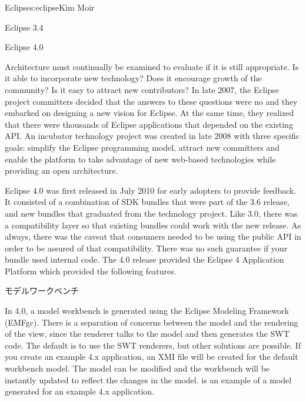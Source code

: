 \begin{aosachapter}{Eclipse}{s:eclipse}{Kim Moir}
\begin{aosasect1}{Eclipse 3.4}
\end{aosasect1}

\begin{aosasect1}{Eclipse 4.0}

Architecture must continually be examined to evaluate if it is still
appropriate. Is it able to incorporate new technology? Does it
encourage growth of the community?  Is it easy to attract new
contributors?  In late 2007, the Eclipse project committers decided
that the answers to these questions were no and they embarked on
designing a new vision for Eclipse. At the same time, they realized
that there were thousands of Eclipse applications that depended on the
existing API\@.  An incubator technology project was created in late
2008 with three specific goals: simplify the Eclipse programming
model, attract new committers and enable the platform to take
advantage of new web-based technologies while providing an open
architecture.


Eclipse 4.0 was first released in July 2010 for early adopters to
provide feedback. It consisted of a combination of SDK bundles that
were part of the 3.6 release, and new bundles that graduated from the
technology project.  Like 3.0, there was a compatibility layer so that
existing bundles could work with the new release. As always, there was
the caveat that consumers needed to be using the public API in order
to be assured of that compatibility.  There was no such guarantee if
your bundle used internal code. The 4.0 release provided the Eclipse 4
Application Platform which provided the following features.

\begin{aosasect2}{モデルワークベンチ}

In 4.0, a model workbench is generated using the Eclipse Modeling
Framework (EMFgc). There is a separation of concerns between the model
and the rendering of the view, since the renderer talks to the model
and then generates the SWT code. The default is to use the SWT
renderers, but other solutions are possible.  If you create an example
4.x application, an XMI file will be created for the default workbench
model. The model can be modified and the workbench will be instantly
updated to reflect the changes in the model. 
is an example of a model generated for an example 4.x application.


\end{aosasect2}
\end{aosasect1}
\end{aosachapter}
